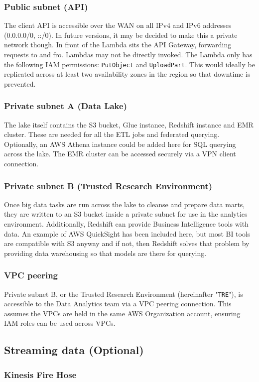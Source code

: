 \documentclass[10pt]{article}
\begin{document}
\subsubsection{Public subnet (API)}
The client API is accessible over the WAN on all IPv4 and IPv6 addresses (0.0.0.0/0, ::/0). In future versions, it may be decided to make this a private network though. In front of the Lambda sits the API Gateway, forwarding requests to and fro. Lambdas may not be directly invoked. The Lambda only has the following IAM permissions: \texttt{PutObject} and \texttt{UploadPart}. This would ideally be replicated across at least two availability zones in the region so that downtime is prevented.
\subsubsection{Private subnet A (Data Lake)}
The lake itself contains the S3 bucket, Glue instance, Redshift instance and EMR cluster. These are needed for all the ETL jobs and federated querying. Optionally, an AWS Athena instance could be added here for SQL querying across the lake. The EMR cluster can be accessed securely via a VPN client connection.
\subsubsection{Private subnet B (Trusted Research Environment)}
Once big data tasks are run across the lake to cleanse and prepare data marts, they are written to an S3 bucket inside a private subnet for use in the analytics environment. Additionally, Redshift can provide Business Intelligence tools with data. An example of AWS QuickSight has been included here, but most BI tools are compatible with S3 anyway and if not, then Redshift solves that problem by providing data warehousing so that models are there for querying.
\subsubsection{VPC peering}
Private subnet B, or the Trusted Research Environment (hereinafter "\texttt{TRE}"), is accessible to the Data Analytics team via a VPC peering connection. This assumes the VPCs are held in the same AWS Organization account, ensuring IAM roles can be used across VPCs.

\subsection{Streaming data (Optional)}
\subsubsection{Kinesis Fire Hose}
\end{document}
